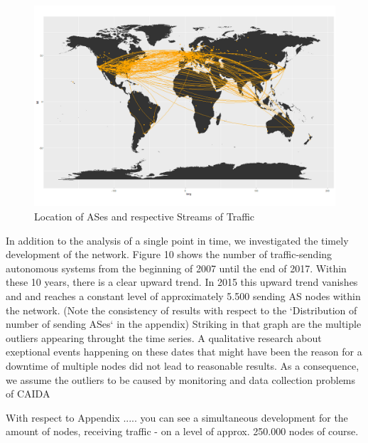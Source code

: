 \documentclass[conference, 11pt]{IEEEtran}
\begin{document}
\vspace{0.5cm}
\begin{figure}[htbp]
\centerline{\includegraphics[scale=0.2]{Graphics/connectedASes.png}}
\caption{Location of ASes and respective Streams of Traffic}
\label{fig}
\end{figure}
\vspace{0.5cm}

In addition to the analysis of a single point in time, we investigated the timely development of the network. Figure 10 shows the number of traffic-sending autonomous systems from the beginning of 2007 until the end of 2017. Within these 10 years, there is a clear upward trend. In 2015 this upward trend vanishes and and reaches a constant level of approximately 5.500 sending AS nodes within the network. (Note the consistency of results with respect to  the `Distribution of number of sending ASes` in the appendix) Striking in that graph are the multiple outliers appearing throught the time series. A qualitative research about exeptional events happening on these dates that might have been the reason for a downtime of multiple nodes did not lead to reasonable results. As a consequence, we assume the outliers to be caused by monitoring and data collection problems of CAIDA \cite{CaidaDataCollection}

With respect to Appendix .....  you can see a simultaneous development for the amount of nodes, receiving traffic - on a level of approx. 250.000 nodes of course. 
\end{document}
